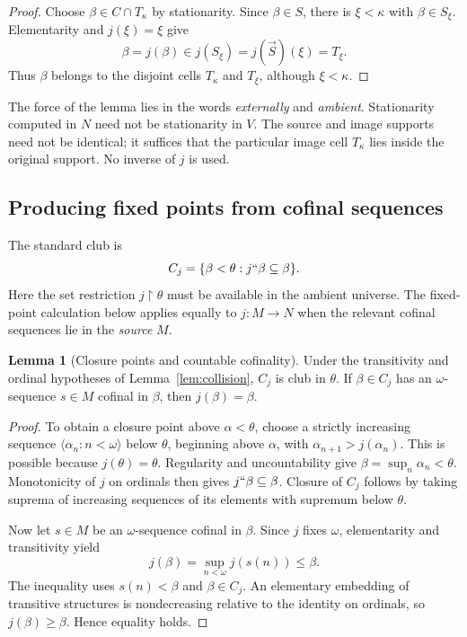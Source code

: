 \documentclass[11pt,letterpaper]{article}
\theoremstyle{definition}
\newtheorem{lemma}[definition]{Lemma}
\newcommand{\restr}{\mathbin{\upharpoonright}}
\begin{document}
\begin{proof}
Choose $\beta\in C\cap T_\kappa$ by stationarity. Since $\beta\in S$, there is $\xi<\kappa$ with $\beta\in S_\xi$. Elementarity and $j(\xi)=\xi$ give
\[
 \beta=j(\beta)\in j(S_\xi)=j(\vec S)(\xi)=T_\xi.
\]
Thus $\beta$ belongs to the disjoint cells $T_\kappa$ and $T_\xi$, although $\xi<\kappa$.
\end{proof}

The force of the lemma lies in the words \emph{externally} and \emph{ambient}. Stationarity computed in $N$ need not be stationarity in $V$. The source and image supports need not be identical; it suffices that the particular image cell $T_\kappa$ lies inside the original support. No inverse of $j$ is used.

\subsection{Producing fixed points from cofinal sequences}

The standard club is
\[
 C_j=\{\beta<\theta:j``\beta\subseteq\beta\}.
\]
Here the set restriction $j\restr\theta$ must be available in the ambient universe. The fixed-point calculation below applies equally to $j:M\to N$ when the relevant cofinal sequences lie in the \emph{source} $M$.

\begin{lemma}[Closure points and countable cofinality]\label{lem:closure}
Under the transitivity and ordinal hypotheses of Lemma~\ref{lem:collision}, $C_j$ is club in $\theta$. If $\beta\in C_j$ has an $\omega$-sequence $s\in M$ cofinal in $\beta$, then $j(\beta)=\beta$.
\end{lemma}

\begin{proof}
To obtain a closure point above $\alpha<\theta$, choose a strictly increasing sequence $\langle\alpha_n:n<\omega\rangle$ below $\theta$, beginning above $\alpha$, with $\alpha_{n+1}>j(\alpha_n)$. This is possible because $j(\theta)=\theta$. Regularity and uncountability give $\beta=\sup_n\alpha_n<\theta$. Monotonicity of $j$ on ordinals then gives $j``\beta\subseteq\beta$. Closure of $C_j$ follows by taking suprema of increasing sequences of its elements with supremum below $\theta$.

Now let $s\in M$ be an $\omega$-sequence cofinal in $\beta$. Since $j$ fixes $\omega$, elementarity and transitivity yield
\[
 j(\beta)=\sup_{n<\omega}j(s(n))\leq\beta.
\]
The inequality uses $s(n)<\beta$ and $\beta\in C_j$. An elementary embedding of transitive structures is nondecreasing relative to the identity on ordinals, so $j(\beta)\geq\beta$. Hence equality holds.
\end{proof}
\end{document}
